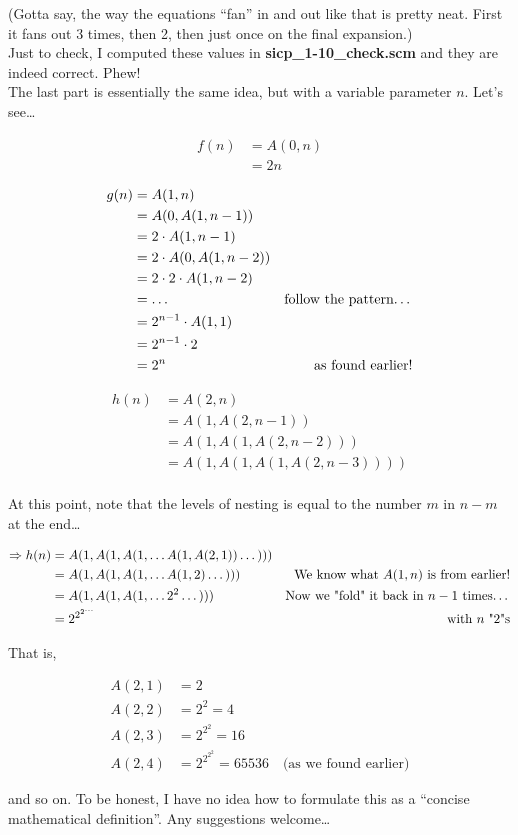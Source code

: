\documentclass{report}
\begin{document}
(Gotta say, the way the equations ``fan'' in and out like that is pretty neat. First it fans out 3 times, then 2, then just once on the final expansion.) \\

Just to check, I computed these values in \textbf{sicp\_1-10\_check.scm} and they are indeed correct. Phew! \\

The last part is essentially the same idea, but with a variable parameter $n$. Let's see\dots

\begin{align*}
  f(n) &= A(0, n) \\
       &= 2n
\end{align*}

\begin{align*}
  g(n) &= A(1, n) \\
       &= A(0, A(1, n - 1)) \\
       &= 2 \cdot A(1, n - 1) \\
       &= 2 \cdot A(0, A(1, n - 2)) \\
       &= 2 \cdot 2 \cdot A(1, n - 2) \\
       &= \dots & \text{follow the pattern\dots} \\
       &= 2^{n - 1} \cdot A(1, 1) \\
       &= 2^{n - 1} \cdot 2 \\
       &= 2^n & \text{as found earlier!}
\end{align*}

\begin{align*}
  h(n) &= A(2, n) \\
       &= A(1, A(2, n - 1)) \\
       &= A(1, A(1, A(2, n - 2))) \\
       &= A(1, A(1, A(1, A(2, n - 3)))) \\
\end{align*}

At this point, note that the levels of nesting is equal to the number $m$ in $n - m$ at the end\dots

\begin{align*}
  \Rightarrow h(n)
       &= A(1, A(1, A(1, \dots A(1, A(2, 1)) \dots ))) \\
       &= A(1, A(1, A(1, \dots A(1, 2) \dots ))) & \text{We know what $A(1, n)$ is from earlier!} \\
       &= A(1, A(1, A(1, \dots 2^2 \dots ))) & \text{Now we "fold" it back in $n - 1$ times\dots} \\
       &= 2^{2^{2^{\dots}}} & \text{with $n$ "2"s} \\
\end{align*}

That is,

\begin{align*}
  A(2, 1) &= 2 \\
  A(2, 2) &= 2^2 = 4 \\
  A(2, 3) &= 2^{2^2} = 16 \\
  A(2, 4) &= 2^{2^{2^2}} = 65536 \quad \text{(as we found earlier)}
\end{align*}

and so on. To be honest, I have no idea how to formulate this as a ``concise mathematical definition''. Any suggestions welcome\dots
\end{document}
